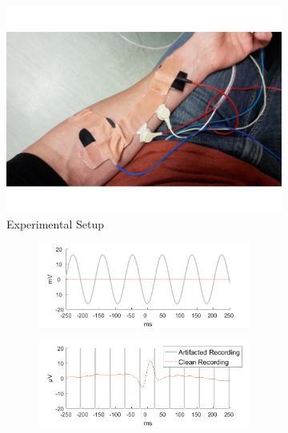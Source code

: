 \documentclass[a4paper]{article}
\begin{document}
\begin{figure}[hbtp]
    \begin{subfigure}{.245\textwidth}
        \includegraphics[width=\textwidth]{./img/div/upper_limb_ecg.jpg}
    \caption{Experimental Setup}\label{fig:ecg_setup}
    \end{subfigure}
    \begin{subfigure}{.75\textwidth}
        \begin{subfigure}{.45\textwidth}
            \includegraphics[width=\textwidth]{./img/eva/ecg_raw_1.png}
        \end{subfigure}
        \begin{subfigure}{.45\textwidth}
            \includegraphics[width=\textwidth]{./img/eva/ecg_raw_2.png}

\end{subfigure}
\end{subfigure}
\end{figure}
\end{document}
